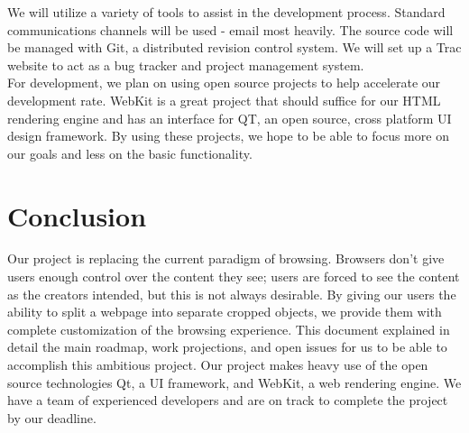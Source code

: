 \documentclass[12pt]{article}
\begin{document}
We will utilize a variety of tools to assist in the development process. Standard communications channels will be used - email most heavily. The source code will be managed with Git, a distributed revision control system. We will set up a Trac website to act as a bug tracker and project management system.\\

For development, we plan on using open source projects to help accelerate our development rate. WebKit is a great project that should suffice for our HTML rendering engine and has an interface for QT, an open source, cross platform UI design framework. By using these projects, we hope to be able to focus more on our goals and less on the basic functionality.
\section{Conclusion} %
\label{sec:conclusion}
Our project is replacing the current paradigm of browsing. Browsers don't give users enough control over the content they see; users are forced to see the content as the creators intended, but this is not always desirable. By giving our users the ability to split a webpage into separate cropped objects, we provide them with complete customization of the browsing experience. This document explained in detail the main roadmap, work projections, and open issues for us to be able to accomplish this ambitious project. Our project makes heavy use of the open source technologies Qt, a UI framework, and WebKit, a web rendering engine. We have a team of experienced developers and are on track to complete the project by our deadline.
\end{document}
